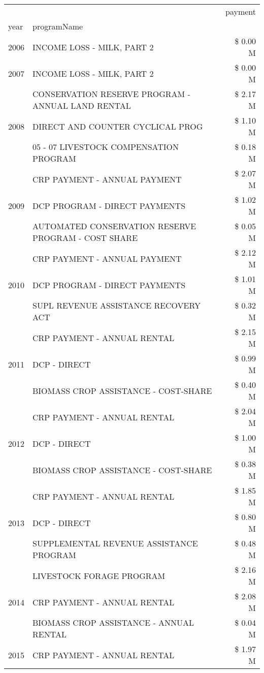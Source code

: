 \begin{tabular}{llr}
\toprule
 &  & payment \\
year & programName &  \\
\midrule
2006 & INCOME LOSS - MILK, PART 2 & \$ 0.00 M \\
\cline{1-3}
2007 & INCOME LOSS - MILK, PART 2 & \$ 0.00 M \\
\cline{1-3}
\multirow[t]{3}{*}{2008} & CONSERVATION RESERVE PROGRAM - ANNUAL LAND RENTAL & \$ 2.17 M \\
 & DIRECT AND COUNTER CYCLICAL PROG & \$ 1.10 M \\
 & 05 - 07 LIVESTOCK COMPENSATION PROGRAM & \$ 0.18 M \\
\cline{1-3}
\multirow[t]{3}{*}{2009} & CRP PAYMENT - ANNUAL PAYMENT & \$ 2.07 M \\
 & DCP PROGRAM - DIRECT PAYMENTS & \$ 1.02 M \\
 & AUTOMATED CONSERVATION RESERVE PROGRAM - COST SHARE & \$ 0.05 M \\
\cline{1-3}
\multirow[t]{3}{*}{2010} & CRP PAYMENT - ANNUAL PAYMENT & \$ 2.12 M \\
 & DCP PROGRAM - DIRECT PAYMENTS & \$ 1.01 M \\
 & SUPL REVENUE ASSISTANCE RECOVERY ACT & \$ 0.32 M \\
\cline{1-3}
\multirow[t]{3}{*}{2011} & CRP PAYMENT - ANNUAL RENTAL & \$ 2.15 M \\
 & DCP - DIRECT & \$ 0.99 M \\
 & BIOMASS CROP ASSISTANCE - COST-SHARE & \$ 0.40 M \\
\cline{1-3}
\multirow[t]{3}{*}{2012} & CRP PAYMENT - ANNUAL RENTAL & \$ 2.04 M \\
 & DCP - DIRECT & \$ 1.00 M \\
 & BIOMASS CROP ASSISTANCE - COST-SHARE & \$ 0.38 M \\
\cline{1-3}
\multirow[t]{3}{*}{2013} & CRP PAYMENT - ANNUAL RENTAL & \$ 1.85 M \\
 & DCP - DIRECT & \$ 0.80 M \\
 & SUPPLEMENTAL REVENUE ASSISTANCE PROGRAM & \$ 0.48 M \\
\cline{1-3}
\multirow[t]{3}{*}{2014} & LIVESTOCK FORAGE PROGRAM & \$ 2.16 M \\
 & CRP PAYMENT - ANNUAL RENTAL & \$ 2.08 M \\
 & BIOMASS CROP ASSISTANCE - ANNUAL RENTAL & \$ 0.04 M \\
\cline{1-3}
\multirow[t]{3}{*}{2015} & CRP PAYMENT - ANNUAL RENTAL & \$ 1.97 M \\

\end{tabular}
